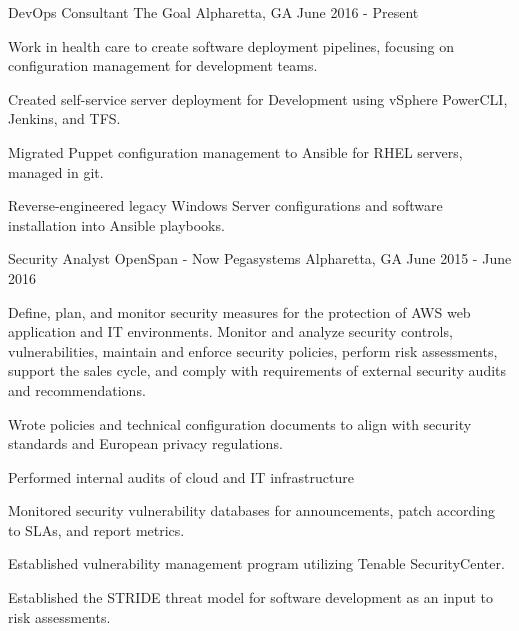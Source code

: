 


\begin{cventries}


\cventry
{DevOps Consultant}
{The Goal}
{Alpharetta, GA}
{June 2016 - Present}
{ %
Work in health care to create software deployment pipelines, focusing on configuration management for development teams.
\begin{cvitems}
\item[]
\item {Created self-service server deployment for Development using vSphere PowerCLI, Jenkins, and TFS.}
\item {Migrated Puppet configuration management to Ansible for RHEL servers, managed in git.}
\item {Reverse-engineered legacy Windows Server configurations and software installation into Ansible playbooks.}
\end{cvitems}
}


\cventry
{Security Analyst}
{OpenSpan - Now Pegasystems}
{Alpharetta, GA}
{June 2015 - June 2016}
{ %
Define, plan, and monitor security measures for the protection of AWS web application and IT environments. Monitor and analyze security controls, vulnerabilities, maintain and enforce security policies, perform risk assessments, support the sales cycle, and comply with requirements of external security audits and recommendations.
\begin{cvitems}
\item[]
\item {Wrote policies and technical configuration documents to align with security standards and European privacy regulations.}
\item {Performed internal audits of cloud and IT infrastructure}
\item {Monitored security vulnerability databases for announcements, patch according to SLAs, and report metrics.}
\item {Established vulnerability management program utilizing Tenable SecurityCenter.}
\item {Established the STRIDE threat model for software development as an input to risk assessments.}
\end{cvitems}
}


\end{cventries}
